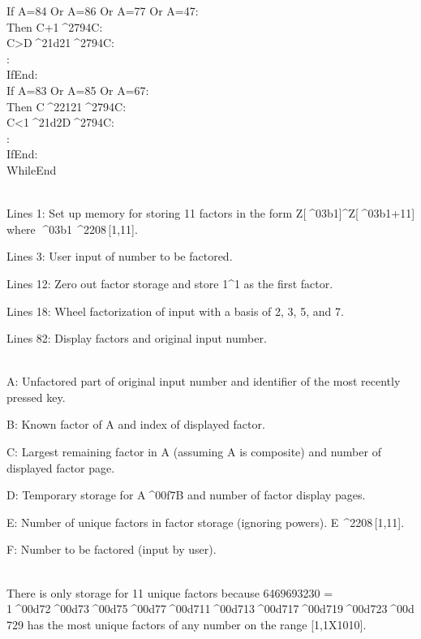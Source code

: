 \documentclass[11pt,letterpaper]{article}
\newcommand{\STO}{{\large ^^^^2794}}
\newcommand{\CBR}{{\Large ^^^^21d2}}
\newcommand{\MUL}{^^^^00d7}
\newcommand{\DIV}{^^^^00f7}
\newcommand{\MINUS}{^^^^2212}
\newcommand{\EXPTEN}{{\scriptsize X10}}
\newcommand{\ELEM}{^^^^2208}
\newcommand{\ALPHA}{^^^^03b1}
\newcommand{\IDENT}[1]{\hspace*{#1\BaseIndent}}
\begin{document}
\begin{multicols}{2}
\begin{linenumbers}
\IDENT{1}If A=84 Or A=86 Or A=77 Or A=47:\\
\IDENT{2}Then C+1\STO C:\\
\IDENT{2}C>D\CBR 1\STO C:\\
\IDENT{2}:\\
\IDENT{1}IfEnd:\\
\IDENT{1}If A=83 Or A=85 Or A=67:\\
\IDENT{2}Then C\MINUS 1\STO C:\\
\IDENT{2}C<1\CBR D\STO C:\\
\IDENT{2}:\\
\IDENT{1}IfEnd:\\
WhileEnd
\end{linenumbers}


\\
Lines 1: Set up memory for storing 11 factors in the form Z[\ALPHA]\textasciicircum Z[\ALPHA +11] where \ALPHA\,\ELEM \,[1,11].

Lines 3: User input of number to be factored.

Lines 12: Zero out factor storage and store 1\textasciicircum 1 as the first factor.

Lines 18: Wheel factorization of input with a basis of 2, 3, 5, and 7.

Lines 82: Display factors and original input number.

\\
A: Unfactored part of original input number and identifier of the most recently pressed key.

B: Known factor of A and index of displayed factor.

C: Largest remaining factor in A (assuming A is composite) and number of displayed factor page.

D: Temporary storage for A\DIV B and number of factor display pages.

E: Number of unique factors in factor storage (ignoring powers). E\,\ELEM \,[1,11].

F: Number to be factored (input by user).

\\
There is only storage for 11 unique factors because 6469693230 =\\
1\MUL 2\MUL 3\MUL 5\MUL 7\MUL 11\MUL 13\MUL 17\MUL 19\MUL 23\MUL 29 has the most unique factors of any number on the range [1,1\EXPTEN 10].


\end{multicols}
\end{document}
